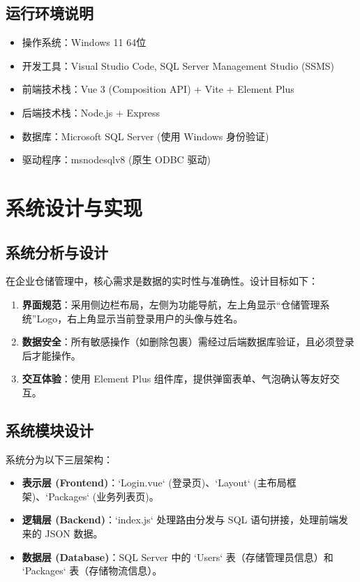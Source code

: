 \documentclass[UTF8, a4paper, 12pt]{ctexart}
\begin{document}
\subsection{运行环境说明}
\begin{itemize}
    \item 操作系统：Windows 11 64位
    \item 开发工具：Visual Studio Code, SQL Server Management Studio (SSMS)
    \item 前端技术栈：Vue 3 (Composition API) + Vite + Element Plus
    \item 后端技术栈：Node.js + Express
    \item 数据库：Microsoft SQL Server (使用 Windows 身份验证)
    \item 驱动程序：msnodesqlv8 (原生 ODBC 驱动)
\end{itemize}

\section{系统设计与实现}

\subsection{系统分析与设计}
在企业仓储管理中，核心需求是数据的实时性与准确性。设计目标如下：
\begin{enumerate}
    \item \textbf{界面规范}：采用侧边栏布局，左侧为功能导航，左上角显示“仓储管理系统”Logo，右上角显示当前登录用户的头像与姓名。
    \item \textbf{数据安全}：所有敏感操作（如删除包裹）需经过后端数据库验证，且必须登录后才能操作。
    \item \textbf{交互体验}：使用 Element Plus 组件库，提供弹窗表单、气泡确认等友好交互。
\end{enumerate}

\subsection{系统模块设计}
系统分为以下三层架构：
\begin{itemize}
    \item \textbf{表示层 (Frontend)}：`Login.vue` (登录页)、`Layout` (主布局框架)、`Packages` (业务列表页)。
    \item \textbf{逻辑层 (Backend)}：`index.js` 处理路由分发与 SQL 语句拼接，处理前端发来的 JSON 数据。
    \item \textbf{数据层 (Database)}：SQL Server 中的 `Users` 表（存储管理员信息）和 `Packages` 表（存储物流信息）。
\end{itemize}
\end{document}
